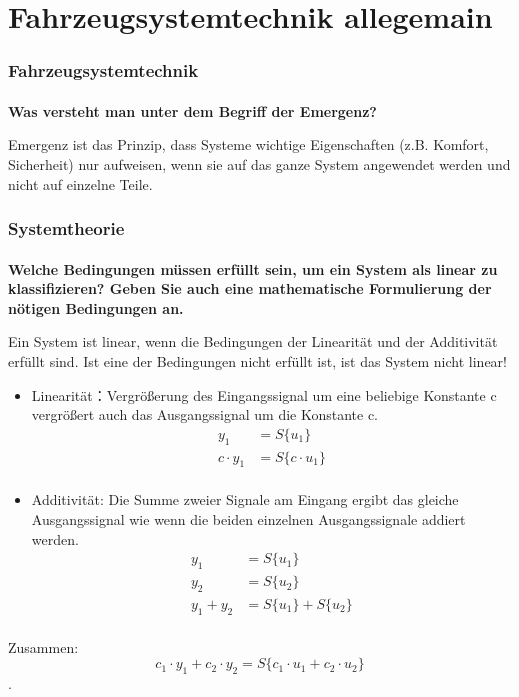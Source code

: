 \part{Fahrzeugsystemtechnik allegemain}
\section{Fahrzeugsystemtechnik}
\subsection{}\textbf{Was versteht man unter dem Begriff der Emergenz?}

Emergenz ist das Prinzip, dass Systeme wichtige Eigenschaften (z.B. Komfort, Sicherheit) nur aufweisen, wenn sie auf das ganze System angewendet werden und nicht auf einzelne Teile.

\section{Systemtheorie}
\subsection{}
\textbf{Welche Bedingungen müssen erfüllt sein, um ein System als linear zu klassifizieren? Geben Sie auch eine mathematische Formulierung der nötigen Bedingungen an.}

Ein System ist linear, wenn die Bedingungen der Linearität und der Additivität erfüllt sind. Ist eine der Bedingungen nicht erfüllt ist, ist das System nicht linear!
\begin{itemize}
    \item Linearit\"at：Vergrößerung des Eingangssignal um eine beliebige Konstante c vergrößert auch das Ausgangssignal um die Konstante c.
          \begin{equation}
              \begin{aligned}
                  y_1        & =S\{u_1\}        \\
                  c\cdot y_1 & =S\{c\cdot u_1\} \\
              \end{aligned}
          \end{equation}
    \item Additivit\"at: Die Summe zweier Signale am Eingang ergibt das gleiche Ausgangssignal wie wenn die beiden einzelnen Ausgangssignale addiert werden.
          \begin{equation}
              \begin{aligned}
                  y_1     & =S\{u_1\}          \\
                  y_2     & =S\{u_2\}          \\
                  y_1+y_2 & =S\{u_1\}+S\{u_2\} \\
              \end{aligned}
          \end{equation}
\end{itemize}
Zusammen:
\begin{equation}
    c_1\cdot y_1+c_2\cdot y_2=S\{c_1\cdot u_1+c_2\cdot u_2\}
\end{equation}.

